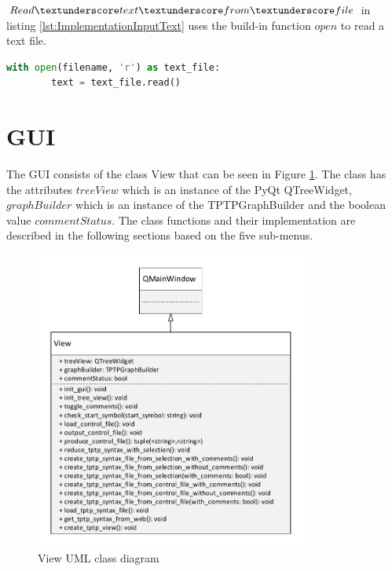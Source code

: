 $Read\textunderscore text\textunderscore from\textunderscore file$ in listing \ref{lst:ImplementationInputText} uses the build-in function $open$ to read a text file. \\

\begin{lstlisting}[language=Python, basicstyle=\scriptsize	,caption= Read text from file,label= lst:ImplementationInputText]
with open(filename, 'r') as text_file:
        text = text_file.read()
\end{lstlisting} 

\section{GUI}\label{sec:ImplementationGUI}
The GUI consists of the class View that can be seen in Figure \ref{fig:ImplementationViewClassDiagram}. The class has the attributes $treeView$ which is an instance of the PyQt QTreeWidget, $graphBuilder$ which is an instance of the TPTPGraphBuilder and the boolean value $commentStatus$. The class functions and their implementation are described in the following sections based on the five sub-menus.

\begin{figure}[H]
\centering
\includegraphics[width=0.8\textwidth]{images/Implementation_view_class_diagramm.pdf}
\caption{View UML class diagram}
\label{fig:ImplementationViewClassDiagram}
\end{figure}

